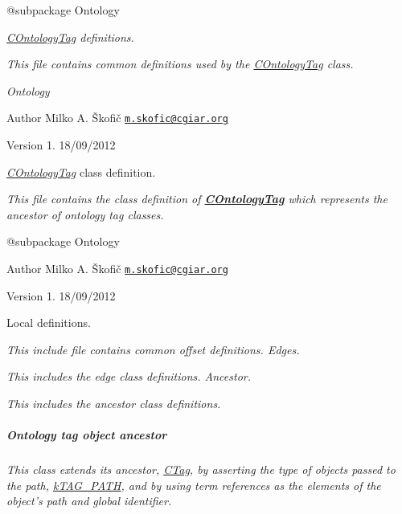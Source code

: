 {\itshape \begin{DoxyVerb} @subpackage        Ontology\end{DoxyVerb}
}

{\itshape \hyperlink{class_c_ontology_tag}{C\-Ontology\-Tag} definitions.}

{\itshape This file contains common definitions used by the \hyperlink{class_c_ontology_tag}{C\-Ontology\-Tag} class.}

{\itshape  Ontology}

{\itshape \begin{DoxyAuthor}{Author}
Milko A. Škofič \href{mailto:m.skofic@cgiar.org}{\tt m.\-skofic@cgiar.\-org} 
\end{DoxyAuthor}
\begin{DoxyVersion}{Version}
1. 18/09/2012
\end{DoxyVersion}
{\itshape \hyperlink{class_c_ontology_tag}{C\-Ontology\-Tag}} class definition.}

{\itshape This file contains the class definition of {\bfseries \hyperlink{class_c_ontology_tag}{C\-Ontology\-Tag}} which represents the ancestor of ontology tag classes.}

{\itshape \begin{DoxyVerb} @subpackage        Ontology
\end{DoxyVerb}
}

{\itshape \begin{DoxyAuthor}{Author}
Milko A. Škofič \href{mailto:m.skofic@cgiar.org}{\tt m.\-skofic@cgiar.\-org} 
\end{DoxyAuthor}
\begin{DoxyVersion}{Version}
1. 18/09/2012
\end{DoxyVersion}
Local definitions.}

{\itshape This include file contains common offset definitions. Edges.}

{\itshape This includes the edge class definitions. Ancestor.}

{\itshape This includes the ancestor class definitions. \subparagraph*{Ontology tag object ancestor}}

{\itshape }

{\itshape This class extends its ancestor, \hyperlink{class_c_tag}{C\-Tag}, by asserting the type of objects passed to the path, \hyperlink{}{k\-T\-A\-G\-\_\-\-P\-A\-T\-H}, and by using term references as the elements of the object's path and global identifier.}

